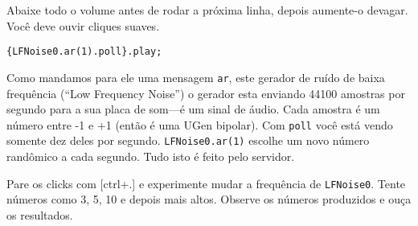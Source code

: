 Abaixe todo o volume antes de rodar a próxima linha, depois aumente-o devagar. Você deve ouvir cliques suaves.

\begin{lstlisting}[style=SuperCollider-IDE, basicstyle=\scttfamily\footnotesize]
{LFNoise0.ar(1).poll}.play;
\end{lstlisting}

Como mandamos para ele uma mensagem \texttt{ar}, este gerador de ruído de baixa frequência (“Low Frequency Noise”) o gerador esta enviando 44100 amostras por segundo para a sua placa de som---é um sinal de áudio. Cada amostra é um número entre -1 e +1 (então é uma UGen bipolar). Com \texttt{poll} você está vendo somente dez deles por segundo. \texttt{LFNoise0.ar(1)} escolhe um novo número randômico a cada segundo. Tudo isto é feito pelo servidor.

Pare os clicks com [ctrl+.] e experimente mudar a frequência de \texttt{LFNoise0}. Tente números como 3, 5, 10 e depois mais altos. Observe os números produzidos e ouça os resultados.
